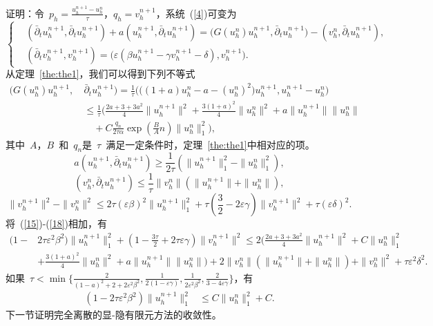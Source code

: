 \documentclass[twoside,UTF8]{nputhesis}
\begin{document}
证明：令~$p_h=\frac{u^{n+1}_h-u^n_h}{\tau}$，$q_h=v^{n+1}_h$，系统~(\ref{4})可变为
\begin{equation*}
\left\{\begin{aligned}&(\bar{\partial}_tu^{n+1}_h,\bar{\partial}_tu^{n+1}_h)+a(u^{n+1}_h,\bar{\partial}_tu^{n+1}_h)
=\Big(G(u^n_h)u_h^{n+1},\bar{\partial}_tu^{n+1}_h\Big)-(v_h^n,\bar{\partial}_tu^{n+1}_h), \\&(\bar{\partial}_tv^{n+1}_h,v^{n+1}_h)=\Big(\varepsilon(\beta u^{n+1}_h-\gamma v^{n+1}_h-\delta),v^{n+1}_h\Big).\end{aligned}\right.
\label{14}
\end{equation*}
从定理~\ref{the:the1}，我们可以得到下列不等式
\begin{equation}
\begin{split}
\Big(G(u^n_h)u_h^{n+1},~&\bar{\partial}_tu^{n+1}_h\Big)=\frac{1}{\tau}\Big(\big((1+a)u^n_h-a-(u^n_h)^2\big)u^{n+1}_h,u^{n+1}_h-u^n_h\Big)\\
&\leq\frac{1}{\tau}\Big(\frac{2a+3+3a^2}{4}\|u^{n+1}_h\|^2+\frac{3(1+a)^2}{4}\|u^{n}_h\|^2+a\|u^{n+1}_h\|\|u^n_h\|\\
&\quad+C\frac{q_n}{2\tau\alpha}\exp(\frac{B}{A}n)\|u^n_h\|^2_{1}\Big),
\label{15}
\end{split}
\end{equation}
其中~$A$，$B$~和~$q_n$是~$\tau$~满足一定条件时，定理~\ref{the:the1}中相对应的项。
\begin{equation}
a(u^{n+1}_h,\bar{\partial}_tu^{n+1}_h)\geq\frac{1}{2\tau}(\|u^{n+1}_h\|^2_{1}-\|u^n_h\|^2_{1}),
\label{16}
\end{equation}
\begin{equation}
(v^n_h,\bar{\partial}_tu^{n+1}_h)\leq\frac{1}{\tau}\|v^n_h\|(\|u^{n+1}_h\|+\|u^n_h\|),
\label{17}
\end{equation}
\begin{equation}
\|v^{n+1}_h\|^2-\|v^n_h\|^2\leq2\tau(\varepsilon\beta)^2\|u^{n+1}_h\|^2_{1}+\tau(\frac{3}{2}-2\varepsilon\gamma)\|v^{n+1}_h\|^2+\tau(\varepsilon\delta)^2.
\label{18}
\end{equation}
将~(\ref{15})-(\ref{18})相加，有
\begin{equation*}
\begin{split}
(1-&2\tau\varepsilon^2\beta^2)\|u^{n+1}_h\|^2_{1}+(1-\frac{3\tau}{2}+2\tau\varepsilon\gamma)\|v^{n+1}_h\|^2\leq2\Big(\frac{2a+3+3a^2}{4}\|u^{n+1}_h\|^2+C\|u^n_h\|^2_1\\
&+\frac{3(1+a)^2}{4}\| u^n_h\|^2+a\| u^{n+1}_h\|\| u^n_h\|\Big)+2\|v^n_h\|(\|u^{n+1}_h\|+\|u^n_h\|)+\|v^n_h\|^2+\tau \varepsilon^2\delta^2.
\label{19}
\end{split}
\end{equation*}
如果~$\tau<\min\{\frac{2}{(1-a)^2+2+2\varepsilon^2\beta^2},\frac{1}{2(1-\varepsilon\gamma)},\frac{1}{2\varepsilon^2\beta^2},\frac{2}{3-4\varepsilon\gamma}\}$，有
\begin{equation*}
\begin{split}
(1-2\tau\varepsilon^2\beta^2)\|u^{n+1}_h\|^2_{1}&\leq C\|u^n_h\|^2_{1}+C.
\label{20}
\end{split}
\end{equation*}
下一节证明完全离散的显-隐有限元方法的收敛性。
\end{document}
